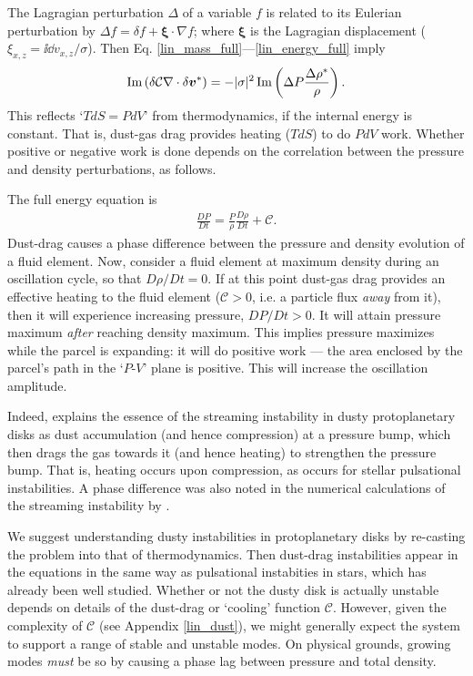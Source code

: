 
The Lagragian perturbation $\Delta$ of a variable $f$ is 
related to its Eulerian perturbation by $\Delta f = \delta f + 
\bm{\xi}\cdot\nabla f$; where $\bm{\xi}$ is the Lagragian  
displacement ($    \xi_{x,z} =  \ii \dd v_{x,z}/\sigma$). 
Then Eq. \ref{lin_mass_full}---\ref{lin_energy_full} imply  
\begin{align} 
  \operatorname{Im} \left(\delta \mathcal{C}
  \nabla\cdot\delta \bm{v}^*\right) = 
  -|\sigma|^2\operatorname{Im} \left(\Delta P 
  \frac{\Delta\rho^*}{\rho}\right). 
\end{align}
This reflects `$TdS  =  PdV$' from thermodynamics, if the 
internal energy is constant. That is, dust-gas drag provides 
heating ($TdS$) to do $PdV$ work. Whether positive or negative work is 
done depends on the correlation between the pressure and density
perturbations, as follows. 

The full energy equation is 
\begin{align*}
  \frac{DP}{Dt} = \frac{P}{\rho}\frac{D\rho}{D t} + \mathcal{C}. 
\end{align*}
Dust-drag causes a phase difference between the 
pressure and density evolution of a fluid element. Now, consider a 
fluid element at maximum density during an oscillation cycle, 
so that $D\rho/ D t = 0$. If at this point dust-gas drag provides an
effective heating to the fluid element ($\mathcal{C}>0$, i.e. a particle
flux \emph{away} from it), then it will 
experience increasing pressure, $DP/D t>0$. It will attain  
pressure maximum \emph{after} reaching density maximum. This implies 
pressure maximizes while the parcel is expanding: it will do 
positive work  --- the area enclosed by the parcel's path in the `$P$-$V$' plane  is 
positive. This will increase the oscillation amplitude.   

Indeed, \cite{jacquet11} explains the essence of the streaming 
instability in dusty protoplanetary disks as dust accumulation
(and hence compression) at a pressure bump, which then drags the 
gas towards it (and hence heating) to strengthen the pressure
bump. That is, heating occurs upon compression, as occurs for stellar 
pulsational instabilities. A phase difference was also noted in the 
numerical calculations of the streaming instability by 
\citet{youdin07b}.    

We suggest understanding dusty instabilities in
protoplanetary disks by re-casting the problem into that of
thermodynamics. Then dust-drag instabilities appear in the equations in the 
same way as pulsational instabities in stars, which has already been 
well studied. Whether or not the dusty disk is actually unstable
depends on details of the dust-drag or `cooling' function
$\mathcal{C}$. However, given the complexity of $\mathcal{C}$ (see
Appendix \ref{lin_dust}), we might generally expect the system to 
support a range of stable and unstable modes. On physical grounds,
growing modes \emph{must} be so by causing a phase lag between
pressure and total density.    


